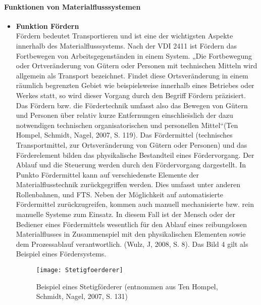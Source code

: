 \paragraph{Funktionen von Materialflusssystemen}
\begin{itemize}
	\item \textbf{Funktion F\"ordern} \\
	F\"ordern bedeutet Transportieren und ist eine der wichtigsten Aspekte innerhalb des Materialflusssystems. Nach der VDI 2411 ist F\"ordern das Fortbewegen von Arbeitsgegenst\"anden in einem System. „Die Fortbewegung oder Ortver\"anderung von G\"utern oder Personen mit technischen Mitteln wird allgemein als Transport bezeichnet. Findet diese Ortsver\"anderung in einem r\"aumlich begrenzten Gebiet wie beispielsweise innerhalb eines Betriebes oder Werkes statt, so wird dieser Vorgang durch den Begriff F\"ordern pr\"azisiert. Das F\"ordern bzw. die F\"ordertechnik umfasst also das Bewegen von G\"utern und Personen \"uber relativ kurze Entfernungen einschlie\"sslich der dazu notwendigen technischen organisatorischen und personellen Mittel“(Ten Hompel, Schmidt, Nagel, 2007, S. 119). 
Das F\"ordermittel (technisches Transportmittel, zur Ortsver\"anderung von G\"utern oder Personen) und das F\"orderelement bilden das physikalische Bestandteil eines F\"ordervorgang. Der Ablauf und die Steuerung werden durch den F\"ordervorgang dargestellt. In Punkto F\"ordermittel kann auf verschiedenste Elemente der Materialflusstechnik zur\"uckgegriffen werden. Dies umfasst unter anderen Rollenbahnen, und FTS. Neben der M\"oglichkeit auf automatisierte F\"ordermittel zur\"uckzugreifen, kommen auch manuell mechanisierte bzw. rein manuelle Systeme zum Einsatz. In diesem Fall ist der Mensch oder der Bediener eines F\"ordermittels wesentlich f\"ur den Ablauf eines reibungslosen Materialflusses in Zusammenspiel mit den physikalischen Elementen sowie dem Prozessablauf verantwortlich. (Wulz, J, 2008, S. 8). Das Bild 4 gilt als Beispiel eines F\"ordersystems. 
	\begin{figure}[h!]
	\centering
  \texttt{[image: Stetigfoerderer]}
	\caption{Beispiel eines Stetigf\"orderer (entnommen aus Ten Hompel, Schmidt, Nagel, 2007, S. 131)}
	\label{Stetigfoerderer}
\end{figure}


\end{itemize}
